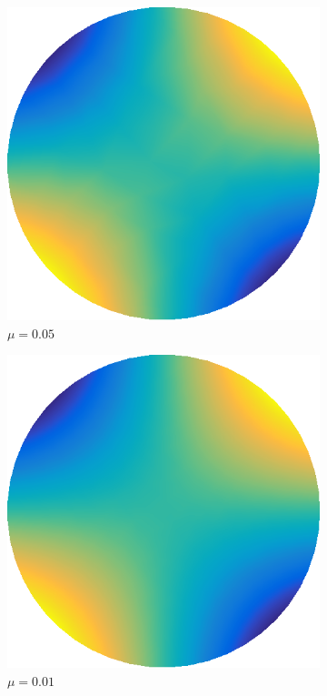 \documentclass[../fem.tex]{subfile}
\begin{document}
\begin{figure}[htpb]
  \begin{subfigure}{0.4\textwidth}
    \centering
    \includegraphics[width=0.8\linewidth]{figures/c1a/approx.png}
    \caption{$\mu=0.05$}
  \end{subfigure}
  \begin{subfigure}{0.4\textwidth}
    \centering
    \includegraphics[width=0.8\linewidth]{figures/c1b/approx.png}
    \caption{$\mu=0.01$}
  \end{subfigure}
  \begin{subfigure}{0.4\textwidth}
    \centering

\end{subfigure}
\end{figure}
\end{document}
